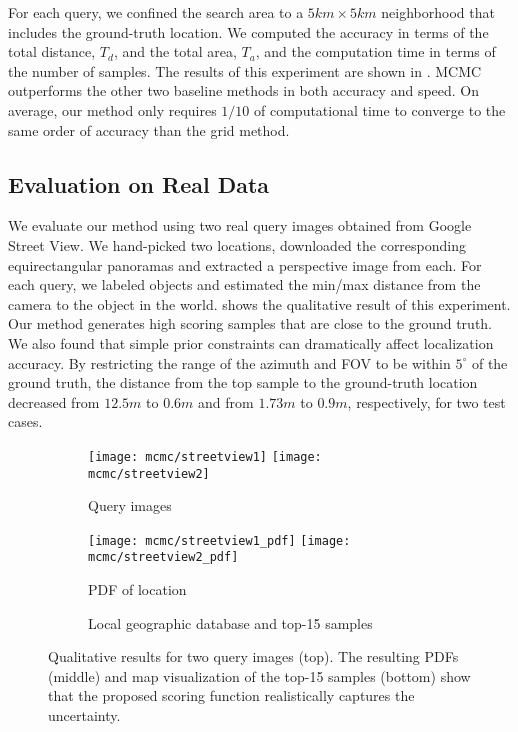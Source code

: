 For each query, we confined the search area to a $5km\times5km$ 
neighborhood that includes the ground-truth location. We computed the
accuracy in terms of the total distance, $T_d$, and the
total area, $T_a$, and the computation time in terms of
the number of samples. The results of this experiment are shown in
. MCMC outperforms the other two baseline methods
in both accuracy and speed. On average, our method only requires
$1/10$ of computational time to converge to the same order of accuracy
than the grid method.

\subsection{Evaluation on Real Data}
\label{sec:qualitative}

We evaluate our method using two real query images obtained from
Google Street View. We hand-picked two locations, downloaded the
corresponding equirectangular panoramas and extracted a perspective
image from each. For each query, we labeled objects and estimated the
min/max distance from the camera to the object in the world.
 shows the qualitative result of this experiment.
Our method generates high scoring samples that are close to the ground
truth. We also found that simple prior constraints can dramatically
affect localization accuracy. By restricting the range of the azimuth
and FOV to be within $5^\circ$ of the ground truth, the distance from
the top sample to the ground-truth location decreased from $12.5m$ to
$0.6m$ and from $1.73m$ to $0.9m$, respectively, for two test
cases.


\begin{figure}
  
  \centering

  \begin{subfigure}{1\linewidth} 
    \centering
    \texttt{[image: mcmc/streetview1]}
    \texttt{[image: mcmc/streetview2]}
    \caption{Query images}
  \end{subfigure}
  \begin{subfigure}{1\linewidth} 
    \centering
    \texttt{[image: mcmc/streetview1\_pdf]}
    \texttt{[image: mcmc/streetview2\_pdf]}
    \caption{PDF of location}
  \end{subfigure}
  \begin{subfigure}{1\linewidth} 
    \centering
    \caption{Local geographic database and top-15 samples}
  \end{subfigure}

  \caption{Qualitative results for two query images (top). The
  resulting PDFs (middle) and map visualization of the top-15 samples
(bottom) show that the proposed scoring function realistically
captures the  uncertainty.}

 \label{fig:real-data}
\end{figure}

